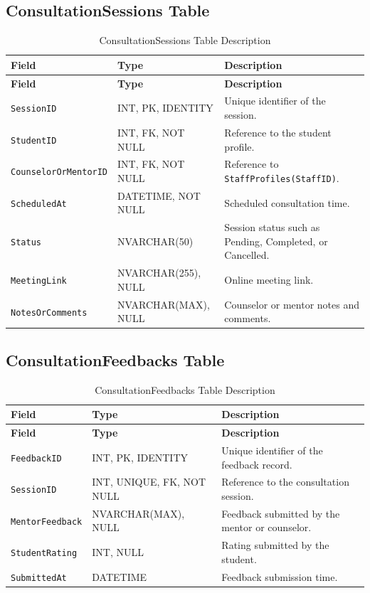 \subsection{ConsultationSessions Table}

\begin{longtable}{|>{\raggedright\arraybackslash}m{2.9cm}|>{\raggedright\arraybackslash}m{3.45cm}|>{\raggedright\arraybackslash}m{4.95cm}|}
\caption{ConsultationSessions Table Description}
\label{tab:consultation_sessions_table_description}
\\
\hline
\textbf{Field} & \textbf{Type} & \textbf{Description} \\
\hline
\endfirsthead
\hline
\textbf{Field} & \textbf{Type} & \textbf{Description} \\
\hline
\endhead
\texttt{SessionID} & INT, PK, IDENTITY & Unique identifier of the session. \\
\hline
\texttt{StudentID} & INT, FK, NOT NULL & Reference to the student profile. \\
\hline
\texttt{CounselorOrMentorID} & INT, FK, NOT NULL & Reference to \texttt{StaffProfiles(StaffID)}. \\
\hline
\texttt{ScheduledAt} & DATETIME, NOT NULL & Scheduled consultation time. \\
\hline
\texttt{Status} & NVARCHAR(50) & Session status such as Pending, Completed, or Cancelled. \\
\hline
\texttt{MeetingLink} & NVARCHAR(255), NULL & Online meeting link. \\
\hline
\texttt{NotesOrComments} & NVARCHAR(MAX), NULL & Counselor or mentor notes and comments. \\
\hline
\end{longtable}

\subsection{ConsultationFeedbacks Table}

\begin{longtable}{|>{\raggedright\arraybackslash}m{2.9cm}|>{\raggedright\arraybackslash}m{3.45cm}|>{\raggedright\arraybackslash}m{4.95cm}|}
\caption{ConsultationFeedbacks Table Description}
\label{tab:consultation_feedbacks_table_description}
\\
\hline
\textbf{Field} & \textbf{Type} & \textbf{Description} \\
\hline
\endfirsthead
\hline
\textbf{Field} & \textbf{Type} & \textbf{Description} \\
\hline
\endhead
\texttt{FeedbackID} & INT, PK, IDENTITY & Unique identifier of the feedback record. \\
\hline
\texttt{SessionID} & INT, UNIQUE, FK, NOT NULL & Reference to the consultation session. \\
\hline
\texttt{MentorFeedback} & NVARCHAR(MAX), NULL & Feedback submitted by the mentor or counselor. \\
\hline
\texttt{StudentRating} & INT, NULL & Rating submitted by the student. \\
\hline
\texttt{SubmittedAt} & DATETIME & Feedback submission time. \\
\hline
\end{longtable}

